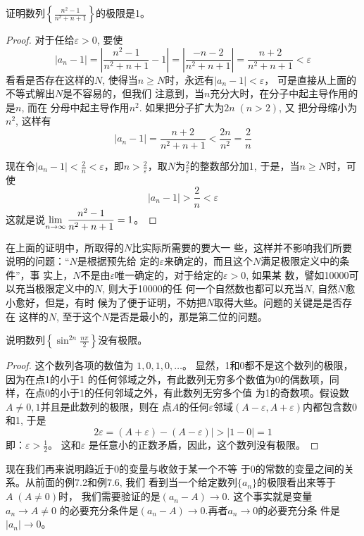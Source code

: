 \begin{example}
    证明数列$\left\{\frac{n^2-1}{n^2+n+1}\right\}$的极限是1。
\end{example}

\begin{proof}
对于任给$\varepsilon>0$, 
要使
\[|a_n-1|=\left|\frac{n^2-1}{n^2+n+1}-1\right|=\left|\frac{-n-2}{n^2+n+1}\right|=\frac{n+2}{n^2+n+1}<\varepsilon\]
看看是否存在这样的$N$, 使得当$n\ge N$时，永远有$|a_n-1|<\varepsilon$，
可是直接从上面的不等式解出$N$是不容易的，但我们
注意到，当$n$充分大时，在分子中起主导作用的是$n$, 而在
分母中起主导作用$n^2$. 如果把分子扩大为$2n\; (n>2)$, 又
把分母缩小为$n^2$, 这样有
\[|a_n-1|=\frac{n+2}{n^2+n+1}<\frac{2n}{n^2}=\frac{2}{n}\]

现在令$|a_n-1|<\frac{2}{n}<\varepsilon$，即$n>\frac{2}{\varepsilon}$，取$N$为$\frac{2}{\varepsilon}$的整数部分加1, 于是，当$n\ge N$时，可使
\[|a_n-1|>\frac{2}{n}<\varepsilon\]
这就是说$\displaystyle\lim_{n\to\infty}\dfrac{n^2-1}{n^2+n+1}=1$。
\end{proof}

在上面的证明中，所取得的$N$比实际所需要的要大一
些，这样并不影响我们所要说明的问题：“$N$是根据预先给
定的$\varepsilon$来确定的，而且这个$N$满足极限定义中的条件”，事
实上，$N$不是由$\varepsilon$唯一确定的，对于给定的$\varepsilon>0$, 如果某
数，譬如10000可以充当极限定义中的$N$, 则大于10000的任
何一个自然数也都可以充当$N$, 自然$N$愈小愈好，但是，有时
候为了便于证明，不妨把$N$取得大些。问题的关键是是否存在
这样的$N$, 至于这个$N$是否是最小的，那是第二位的问题。

\begin{example}
说明数列$\left\{\sin^{2n}\frac{n\pi}{2}\right\}$没有极限。
\end{example}

\begin{proof}
这个数列各项的数值为
$1,0,1,0,\ldots$。
显然，1和0都不是这个数列的极限，因为在点1的小于1
的任何邻域之外，有此数列无穷多个数值为0的偶数项，同
样，在点0的小于1的任何邻域之外，有此数列无穷多个值
为1的奇数项。假设数$A\ne 0,1$并且是此数列的极限，则在
点$A$的任何$\varepsilon$邻域$(A-\varepsilon ,A+\varepsilon )$内都包含数0和1, 于是
\[2\varepsilon =(A+\varepsilon )-(A-\varepsilon )|>|1-0|=1\]
即：$\varepsilon>\frac{1}{2}$。
这和$\varepsilon$ 是任意小的正数矛盾，因此，这个数列没有极限。
\end{proof}

现在我们再来说明趋近于0的变量与收敛于某一个不等
于0的常数的变量之间的关系。从前面的例7.2和例7.6, 我们
看到当一个给定数列$\{a_n\}$的极限看出来等于$A\; (A\ne 0)$时，
我们需要验证的是$(a_n-A)\to 0$. 这个事实就是变量$a_n\to A\ne 0$
的必要充分条件是$(a_n-A)\to 0$.再者$a_n\to 0$的必要充分条
件是$|a_n|\to 0$。

